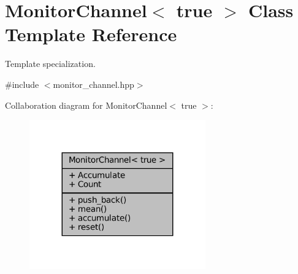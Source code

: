 \hypertarget{classMonitorChannel_3_01true_01_4}{}\section{Monitor\+Channel$<$ true $>$ Class Template Reference}
\label{classMonitorChannel_3_01true_01_4}


Template specialization.  




{\ttfamily \#include $<$monitor\+\_\+channel.\+hpp$>$}



Collaboration diagram for Monitor\+Channel$<$ true $>$\+:
\nopagebreak
\begin{figure}[H]
\begin{center}
\leavevmode
\includegraphics[width=215pt]{db/d9f/classMonitorChannel_3_01true_01_4__coll__graph}
\end{center}
\end{figure}
